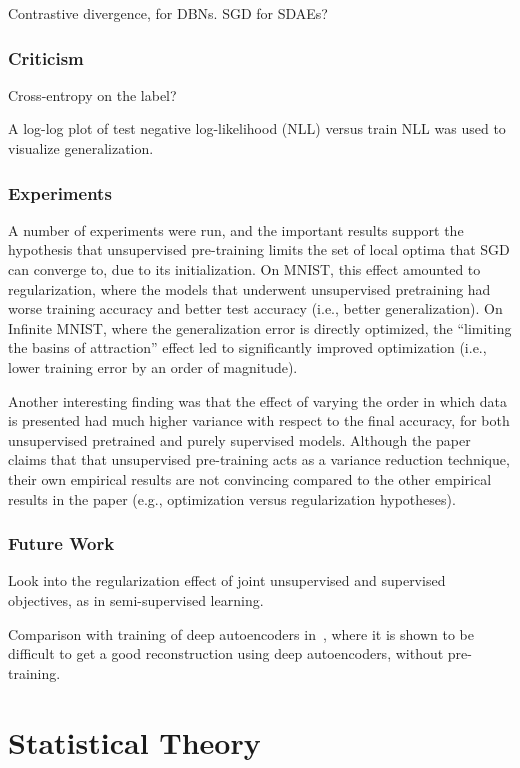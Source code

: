 \documentclass[a4paper, 12pt]{article}
\begin{document}
Contrastive divergence, for DBNs. SGD for SDAEs?


\subsubsection{Criticism}

Cross-entropy on the label?

A log-log plot of test negative log-likelihood (NLL) versus train NLL was used
to visualize generalization.


\subsubsection{Experiments}

A number of experiments were run, and the important results support the
hypothesis that unsupervised pre-training limits the set of local optima that
SGD can converge to, due to its initialization. On MNIST, this effect amounted
to regularization, where the models that underwent unsupervised pretraining had
worse training accuracy and better test accuracy (i.e., better generalization).
On Infinite MNIST, where the generalization error is directly optimized, the
``limiting the basins of attraction'' effect led to significantly improved
optimization (i.e., lower training error by an order of magnitude).

Another interesting finding was that the effect of varying the order in which
data is presented had much higher variance with respect to the final accuracy,
for both unsupervised pretrained and purely supervised models. Although the
paper claims that that unsupervised pre-training acts as a variance reduction
technique, their own empirical results are not convincing compared to the other
empirical results in the paper (e.g., optimization versus regularization
hypotheses).


\subsubsection{Future Work}

Look into the regularization effect of joint unsupervised and supervised
objectives, as in semi-supervised learning.

Comparison with training of deep autoencoders in~\citet{HinSal06}, where it is
shown to be difficult to get a good reconstruction using deep autoencoders,
without pre-training.


\section{Statistical Theory}
\end{document}
